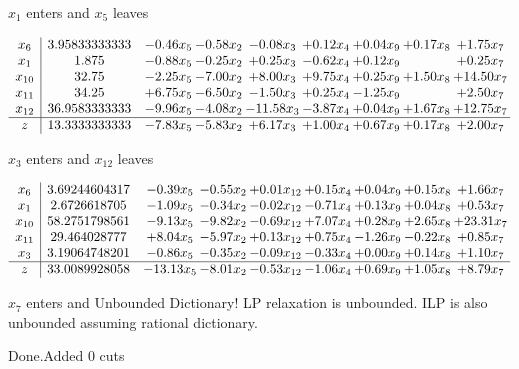 \documentclass[8pt]{article}
\begin{document}
 $ x_{1} $ enters and $ x_{5} $ leaves 

 \[\begin{array}{c| c c@{\hskip 2pt} c@{\hskip 2pt} c@{\hskip 2pt} c@{\hskip 2pt} c@{\hskip 2pt} c@{\hskip 2pt} c@{\hskip 2pt} }
 x_{6}   &  3.95833333333 & -0.46 x_{5} & -0.58 x_{2} & -0.08 x_{3} & +  0.12 x_{4} & +  0.04 x_{9} & +  0.17 x_{8} & +  1.75 x_{7}\\
 x_{1}   &  1.875 & -0.88 x_{5} & -0.25 x_{2} & +  0.25 x_{3} & -0.62 x_{4} & +  0.12 x_{9} &   & +  0.25 x_{7}\\
 x_{10}   &  32.75 & -2.25 x_{5} & -7.00 x_{2} & +  8.00 x_{3} & +  9.75 x_{4} & +  0.25 x_{9} & +  1.50 x_{8} & + 14.50 x_{7}\\
 x_{11}   &  34.25 & +  6.75 x_{5} & -6.50 x_{2} & -1.50 x_{3} & +  0.25 x_{4} & -1.25 x_{9} &   & +  2.50 x_{7}\\
 x_{12}   &  36.9583333333 & -9.96 x_{5} & -4.08 x_{2} & -11.58 x_{3} & -3.87 x_{4} & +  0.04 x_{9} & +  1.67 x_{8} & + 12.75 x_{7}\\
\hline
z    &  13.3333333333 & -7.83 x_{5} & -5.83 x_{2} & +  6.17 x_{3} & +  1.00 x_{4} & +  0.67 x_{9} & +  0.17 x_{8} & +  2.00 x_{7}\\
\end{array}\]


 $ x_{3} $ enters and $ x_{12} $ leaves 

 \[\begin{array}{c| c c@{\hskip 2pt} c@{\hskip 2pt} c@{\hskip 2pt} c@{\hskip 2pt} c@{\hskip 2pt} c@{\hskip 2pt} c@{\hskip 2pt} }
 x_{6}   &  3.69244604317 & -0.39 x_{5} & -0.55 x_{2} & +  0.01 x_{12} & +  0.15 x_{4} & +  0.04 x_{9} & +  0.15 x_{8} & +  1.66 x_{7}\\
 x_{1}   &  2.6726618705 & -1.09 x_{5} & -0.34 x_{2} & -0.02 x_{12} & -0.71 x_{4} & +  0.13 x_{9} & +  0.04 x_{8} & +  0.53 x_{7}\\
 x_{10}   &  58.2751798561 & -9.13 x_{5} & -9.82 x_{2} & -0.69 x_{12} & +  7.07 x_{4} & +  0.28 x_{9} & +  2.65 x_{8} & + 23.31 x_{7}\\
 x_{11}   &  29.464028777 & +  8.04 x_{5} & -5.97 x_{2} & +  0.13 x_{12} & +  0.75 x_{4} & -1.26 x_{9} & -0.22 x_{8} & +  0.85 x_{7}\\
 x_{3}   &  3.19064748201 & -0.86 x_{5} & -0.35 x_{2} & -0.09 x_{12} & -0.33 x_{4} & +  0.00 x_{9} & +  0.14 x_{8} & +  1.10 x_{7}\\
\hline
z    &  33.0089928058 & -13.13 x_{5} & -8.01 x_{2} & -0.53 x_{12} & -1.06 x_{4} & +  0.69 x_{9} & +  1.05 x_{8} & +  8.79 x_{7}\\
\end{array}\]


 $ x_{7} $ enters and Unbounded Dictionary!
 LP relaxation is unbounded. ILP is also unbounded assuming rational dictionary. 

Done.Added 0 cuts 
\end{document}
